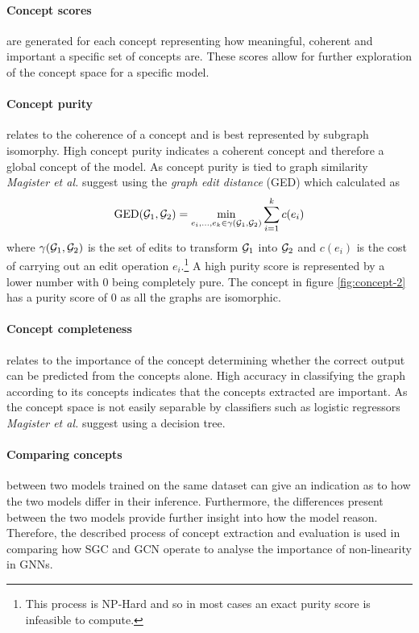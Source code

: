 \paragraph{Concept scores} are generated for each concept representing how meaningful, coherent and important a specific set of concepts are.
These scores allow for further exploration of the concept space for a specific model.

\paragraph{Concept purity}
relates to the coherence of a concept and is best represented by subgraph isomorphy.
High concept purity indicates a coherent concept and therefore a global concept of the model.
As concept purity is tied to graph similarity \textit{Magister et al.}\cite{magister2021gcexplainer} suggest using the \emph{graph edit distance} (GED) which calculated as 
\begin{equation}
    \label{eq:GED}
    \operatorname{GED}({\mathcal{G}}_1, {\mathcal{G}}_2) = \underset{e_i,...,e_k \in \gamma({\mathcal{G}}_1, {\mathcal{G}}_2)}{\operatorname{min}} \sum_{i=1}^{k}c(e_i)
\end{equation}
where $\gamma({\mathcal{G}}_1, {\mathcal{G}}_2)$ is the set of edits to transform ${\mathcal{G}}_1$ into ${\mathcal{G}}_2$ and $c(e_i)$ is the cost of carrying out an edit operation $e_i$.\footnote{This process is NP-Hard and so in most cases an exact purity score is infeasible to compute.}
A high purity score is represented by a lower number with 0 being completely pure.
The concept in figure \ref{fig:concept-2} has a purity score of 0 as all the graphs are isomorphic.

\paragraph{Concept completeness}
relates to the importance of the concept determining whether the correct output can be predicted from the concepts alone.
High accuracy in classifying the graph according to its concepts indicates that the concepts extracted are important.
As the concept space is not easily separable by classifiers such as logistic regressors \textit{Magister et al.}\cite{magister2021gcexplainer} suggest using a decision tree\cite{kazhdan2020now}.



\paragraph{Comparing concepts} between two models trained on the same dataset can give an indication as to how the two models differ in their inference.
Furthermore, the differences present between the two models provide further insight into how the model reason.
Therefore, the described process of concept extraction and evaluation is used in comparing how SGC and GCN operate to analyse the importance of non-linearity in GNNs.  

